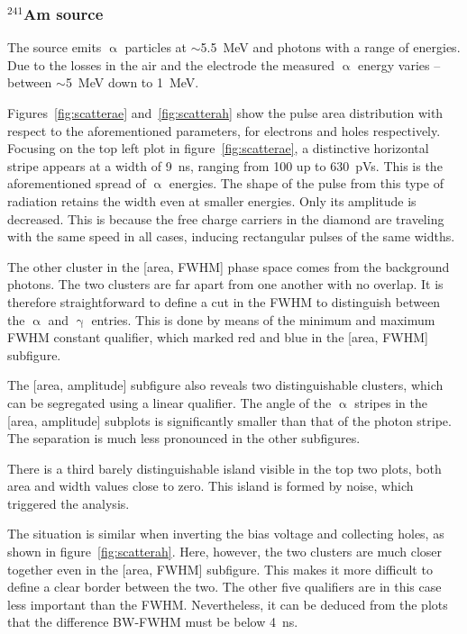  

\subsubsection{$^{241}$Am source}
The source emits $\upalpha$ particles at $\sim$5.5~MeV and photons with a range of energies. Due to the losses in the air and the electrode the measured $\upalpha$ energy varies -- between $\sim$5~MeV down to 1~MeV. 

Figures~\ref{fig:scatterae} and~\ref{fig:scatterah} show the pulse area distribution with respect to the aforementioned parameters, for electrons and holes respectively. 
Focusing on the top left plot in figure~\ref{fig:scatterae}, a distinctive horizontal stripe appears at a width of 9~ns, ranging from 100 up to 630~pVs. This is the aforementioned spread of $\upalpha$ energies. The shape of the pulse from this type of radiation retains the width even at smaller energies. Only its amplitude is decreased. This is because the free charge carriers in the diamond are traveling with the same speed in all cases, inducing rectangular pulses of the same widths. 

The other cluster in the [area, FWHM] phase space comes from the background photons. The two clusters are far apart from one another with no overlap. It is therefore straightforward to define a cut in the FWHM to distinguish between the $\upalpha$ and $\upgamma$ entries. This is done by means of the minimum and maximum FWHM constant qualifier, which marked red and blue in the [area, FWHM] subfigure.

The [area, amplitude] subfigure also reveals two distinguishable clusters, which can be segregated using a linear qualifier. The angle of the $\upalpha$ stripes in the [area, amplitude] subplots is significantly smaller than that of the photon stripe. The separation is much less pronounced in the other subfigures. 

There is a third barely distinguishable island visible in the top two plots, both area and width values close to zero. This island is formed by noise, which triggered the analysis.

The situation is similar when inverting the bias voltage and collecting holes, as shown in figure~\ref{fig:scatterah}. Here, however, the two clusters are much closer together even in the [area, FWHM] subfigure. This makes it more difficult to define a clear border between the two. The other five qualifiers are in this case less important than the FWHM. Nevertheless, it can be deduced from the plots that the difference BW-FWHM must be below 4~ns.

